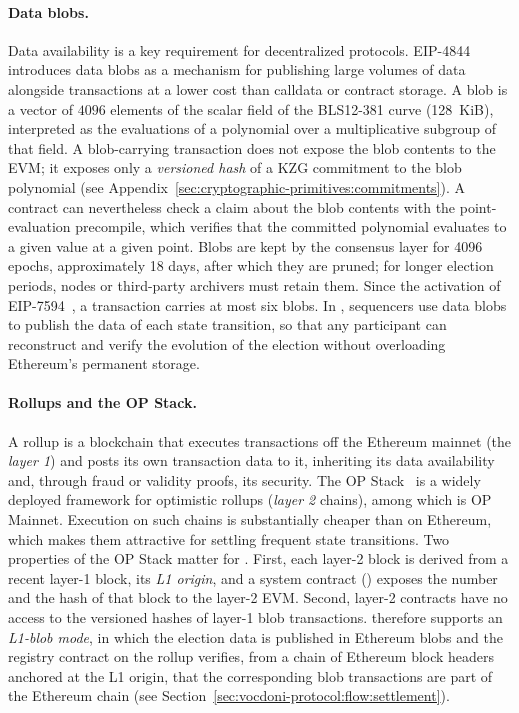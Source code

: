 \paragraph{Data blobs.} Data availability is a key requirement for decentralized protocols. EIP-4844~\cite{eip4844} introduces data blobs as a mechanism for publishing large volumes of data alongside transactions at a lower cost than calldata or contract storage. A blob is a vector of $4096$ elements of the scalar field of the BLS12-381 curve (128~KiB), interpreted as the evaluations of a polynomial over a multiplicative subgroup of that field. A blob-carrying transaction does not expose the blob contents to the \ac{EVM}; it exposes only a \emph{versioned hash} of a \ac{KZG} commitment to the blob polynomial (see Appendix~\ref{sec:cryptographic-primitives:commitments}). A contract can nevertheless check a claim about the blob contents with the point-evaluation precompile, which verifies that the committed polynomial evaluates to a given value at a given point. Blobs are kept by the consensus layer for 4096 epochs, approximately 18 days, after which they are pruned; for longer election periods, nodes or third-party archivers must retain them. Since the activation of EIP-7594~\cite{eip7594}, a transaction carries at most six blobs. In \davinci, sequencers use data blobs to publish the data of each state transition, so that any participant can reconstruct and verify the evolution of the election without overloading Ethereum's permanent storage.

\paragraph{Rollups and the OP Stack.} A rollup is a blockchain that executes transactions off the Ethereum mainnet (the \emph{layer 1}) and posts its own transaction data to it, inheriting its data availability and, through fraud or validity proofs, its security. The OP Stack~\cite{opstack} is a widely deployed framework for optimistic rollups (\emph{layer 2} chains), among which is OP Mainnet. Execution on such chains is substantially cheaper than on Ethereum, which makes them attractive for settling frequent state transitions. Two properties of the OP Stack matter for \davinci. First, each layer-2 block is derived from a recent layer-1 block, its \emph{L1 origin}, and a system contract (\lblock) exposes the number and the hash of that block to the layer-2 \ac{EVM}. Second, layer-2 contracts have no access to the versioned hashes of layer-1 blob transactions. \Davinci therefore supports an \emph{L1-blob mode}, in which the election data is published in Ethereum blobs and the registry contract on the rollup verifies, from a chain of Ethereum block headers anchored at the L1 origin, that the corresponding blob transactions are part of the Ethereum chain (see Section~\ref{sec:vocdoni-protocol:flow:settlement}).

